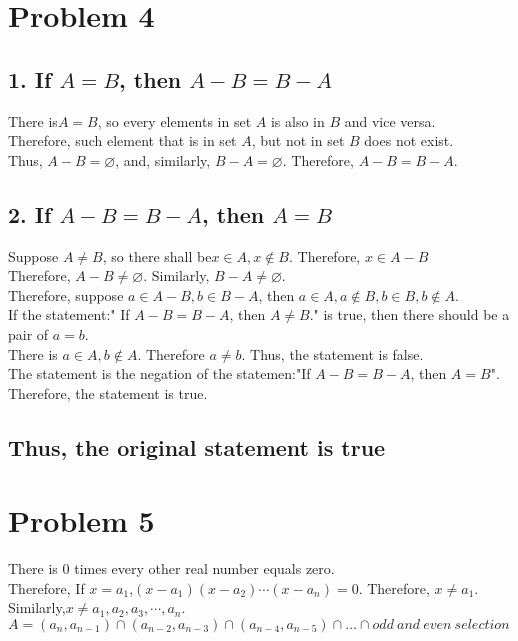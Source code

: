 \documentclass{article}
\begin{document}
\section*{Problem 4}
\subsection*{1. If \(A = B\), then \(A-B=B-A\)}
        There is\(A=B\), so every elements in set \(A\) is also in \(B\) and vice versa.\\
        Therefore, such element that is in set \(A\), but not in set \(B\) does not exist.\\
        Thus, \(A-B=\varnothing\), and, similarly, \(B-A = \varnothing\). 
        Therefore, \(A-B = B-A\).\\
\subsection*{2. If \(A-B=B-A\), then \(A = B\)}
        Suppose \(A\neq B\), so there shall be\(x \in A, x\notin B\). Therefore, \(x\in A-B\)\\
        Therefore, \(A-B \neq \varnothing\). Similarly, \(B-A \neq \varnothing\).\\
        Therefore, suppose \(a \in A-B, b \in B-A\), then \(a \in A, a\notin B, b\in B, b\notin A\).\\
        If the statement:" If \(A-B=B-A\), then \(A\neq B\)." is true, then there should be a pair of \(a=b\).\\
        There is \(a \in A, b \notin A\). Therefore \(a\neq b\). Thus, the statement is false.\\
        The statement is the negation of the statemen:"If \(A-B=B-A\), then \(A = B\)".\\
        Therefore, the statement is true.
\subsection*{Thus, the original statement is true}

\section*{Problem 5}
    There is \(0\) times every other real number equals zero. \\
    Therefore, If \(x ={a_1}\),\((x-a_1)(x-a_2)\cdots(x-a_n)=0\). Therefore, \(x\neq a_1\).\\
    Similarly,\(x\neq a_1, a_2, a_3, \cdots, a_n\).
    \(A = (a_n,a_{n-1})\cap (a_{n-2},a_{n-3})\cap (a_{n-4},a_{n-5})
    \cap \dots \cap odd \ and \ even \ selection\)
\end{document}
